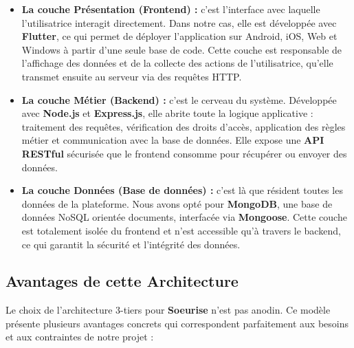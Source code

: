 \documentclass[12pt,a4paper]{report}
\begin{document}
	\begin{itemize}
		\item \textbf{La couche Présentation (Frontend) :} c'est l'interface avec 
		laquelle l'utilisatrice interagit directement. Dans notre cas, elle est 
		développée avec \textbf{Flutter}, ce qui permet de déployer l'application 
		sur Android, iOS, Web et Windows à partir d'une seule base de code. 
		Cette couche est responsable de l'affichage des données et de la collecte 
		des actions de l'utilisatrice, qu'elle transmet ensuite au serveur via 
		des requêtes HTTP.
		
		\item \textbf{La couche Métier (Backend) :} c'est le cerveau du système. 
		Développée avec \textbf{Node.js} et \textbf{Express.js}, elle abrite 
		toute la logique applicative : traitement des requêtes, vérification des 
		droits d'accès, application des règles métier et communication avec la 
		base de données. Elle expose une \textbf{API RESTful} sécurisée que le 
		frontend consomme pour récupérer ou envoyer des données.
		
		\item \textbf{La couche Données (Base de données) :} c'est là que résident 
		toutes les données de la plateforme. Nous avons opté pour \textbf{MongoDB}, 
		une base de données NoSQL orientée documents, interfacée via \textbf{Mongoose}. 
		Cette couche est totalement isolée du frontend et n'est accessible qu'à 
		travers le backend, ce qui garantit la sécurité et l'intégrité des données.
	\end{itemize}
	
	\subsection{Avantages de cette Architecture}
	
	Le choix de l'architecture 3-tiers pour \textbf{Soeurise} n'est pas anodin. 
	Ce modèle présente plusieurs avantages concrets qui correspondent parfaitement 
	aux besoins et aux contraintes de notre projet :
	
\end{document}

